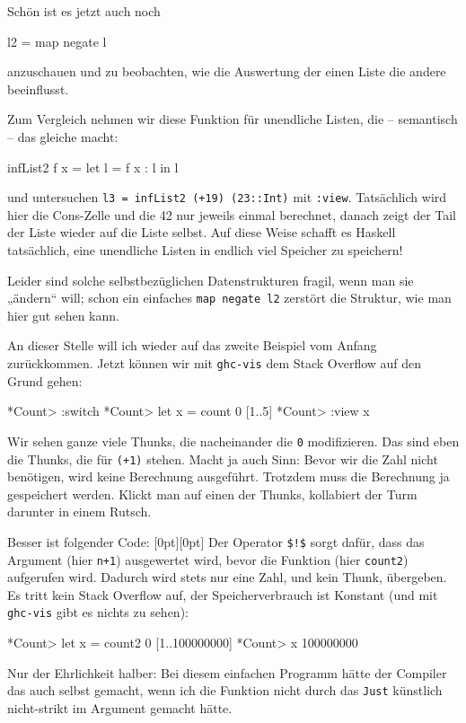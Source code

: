 \documentclass[11pt,DIV=12,parskip=half,headings=normal,abstract]{scrartcl}
\newcommand{\mylabel}[1]{\raisebox{2em}[0pt][0pt]{\makebox[0pt][l]{\makebox[\linewidth][r]{\color{gray}{\sffamily #1}\hspace{2em}}}}\ignorespaces}
\newcommand{\li}{\lstinline[style=haskell]}
\begin{document}
Schön ist es jetzt auch noch
\begin{haskell}
l2 = map negate l
\end{haskell}
anzuschauen und zu beobachten, wie die Auswertung der einen Liste die andere beeinflusst.

Zum Vergleich nehmen wir diese Funktion für unendliche Listen, die -- semantisch -- das gleiche macht:
\begin{haskell}
infList2 f x = let l = f x : l in l
\end{haskell}
und untersuchen \li-l3 = infList2 (+19) (23::Int)- mit \li-:view-. Tatsächlich wird hier die Cons-Zelle und die 42 nur jeweils einmal berechnet, danach zeigt der Tail der Liste wieder auf die Liste selbst. Auf diese Weise schafft es Haskell tatsächlich, eine unendliche Listen in endlich viel Speicher zu speichern!

Leider sind solche selbstbezüglichen Datenstrukturen fragil, wenn man sie „ändern“ will; schon ein einfaches \li-map negate l2- zerstört die Struktur, wie man hier gut sehen kann.


An dieser Stelle will ich wieder auf das zweite Beispiel vom Anfang zurückkommen. Jetzt können wir mit \li!ghc-vis! dem Stack Overflow auf den Grund gehen: 
\begin{ghci}
*Count> :switch
*Count> let x = count 0 [1..5]
*Count> :view x
\end{ghci}
Wir sehen ganze viele Thunks, die nacheinander die \li-0- modifizieren. Das sind eben die Thunks, die für \li-(+1)- stehen. Macht ja auch Sinn: Bevor wir die Zahl nicht benötigen, wird keine Berechnung ausgeführt. Trotzdem muss die Berechnung ja gespeichert werden. Klickt man auf einen der Thunks, kollabiert der Turm darunter in einem Rutsch.

Besser ist folgender Code:
\mylabel{Haskell}
Der Operator \li-$!$- sorgt dafür, dass das Argument (hier \li-n+1-) ausgewertet wird, bevor die Funktion (hier \li-count2-) aufgerufen wird. Dadurch wird stets nur eine Zahl, und kein Thunk, übergeben. Es tritt kein Stack Overflow auf, der Speicherverbrauch ist Konstant (und mit \li!ghc-vis! gibt es nichts zu sehen):
\begin{ghci}
*Count> let x = count2 0 [1..100000000]
*Count> x
100000000
\end{ghci}
Nur der Ehrlichkeit halber: Bei diesem einfachen Programm hätte der Compiler das auch selbst gemacht, wenn ich die Funktion nicht durch das \li-Just- künstlich nicht-strikt im Argument gemacht hätte.
\end{document}
